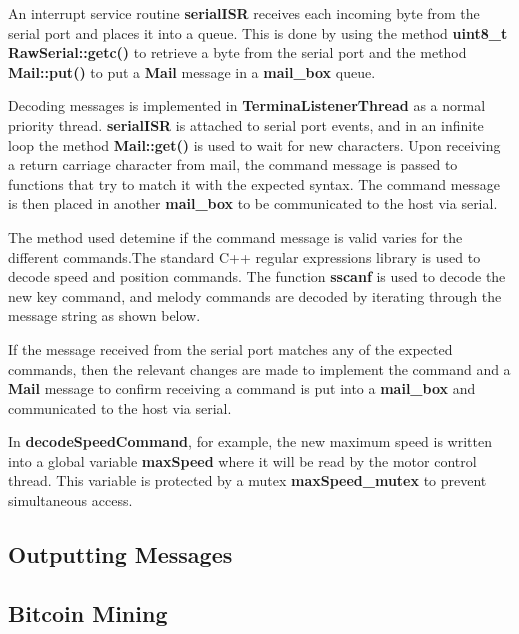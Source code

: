 \documentclass{article}
\begin{document}
\noindent
An interrupt service routine \textbf{serialISR} receives each incoming byte from the serial port and places it into a queue. This is done by using the method \textbf{uint8\_t RawSerial::getc()} to retrieve a byte from the serial port and the method \textbf{Mail::put()} to put a \textbf{Mail} message in a \textbf{mail\_box} queue.
\bigskip

\noindent
Decoding messages is implemented in \textbf{TerminaListenerThread} as a normal priority thread. \textbf{serialISR} is attached to serial port events, and in an infinite loop the method \textbf{Mail::get()} is used to wait for new characters. Upon receiving a return carriage character from mail, the command message is passed to functions that try to match it with the expected syntax. The command message is then placed in another \textbf{mail\_box} to be communicated to the host via serial.

\bigskip
   
\bigskip       

\noindent
The method used detemine if the command message is valid varies for the different commands.The standard C++ regular expressions library is used to decode speed and position commands. The function \textbf{sscanf} is used to decode the new key command, and melody commands are decoded by iterating through the message string as shown below.

\bigskip
  
\bigskip
If the message received from the serial port matches any of the expected commands, then the relevant changes are made to implement the command and a \textbf{Mail} message to confirm receiving a command is put into a \textbf{mail\_box} and communicated to the host via serial. 
\bigskip

In \textbf{decodeSpeedCommand}, for example, the new maximum speed is written into a global variable \textbf{maxSpeed} where it will be read by the motor control thread. This variable is protected by a mutex \textbf{maxSpeed\_mutex} to prevent simultaneous access.


\subsection{Outputting Messages}

\subsection{Bitcoin Mining}
\end{document}
